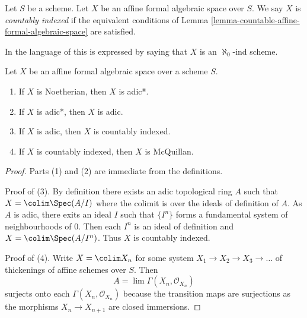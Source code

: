 \begin{definition}
\label{definition-countable}
Let $S$ be a scheme. Let $X$ be an affine formal algebraic space over $S$.
We say $X$ is {\it countably indexed} if the equivalent conditions of
Lemma \ref{lemma-countable-affine-formal-algebraic-space} are satisfied.
\end{definition}

\noindent
In the language of \cite{BVGD} this is expressed by saying that
$X$ is an $\aleph_0$-ind scheme.

\begin{lemma}
\label{lemma-implications-between-types}
Let $X$ be an affine formal algebraic space over a scheme $S$.
\begin{enumerate}
\item If $X$ is Noetherian, then $X$ is adic*.
\item If $X$ is adic*, then $X$ is adic.
\item If $X$ is adic, then $X$ is countably indexed.
\item If $X$ is countably indexed, then $X$ is McQuillan.
\end{enumerate}
\end{lemma}

\begin{proof}
Parts (1) and (2) are immediate from the definitions.

\medskip\noindent
Proof of (3). By definition there exists an adic topological ring $A$
such that $X = \colim \Spec(A/I)$ where the colimit is over the ideals
of definition of $A$. As $A$ is adic, there exits an ideal $I$
such that $\{I^n\}$ forms a fundamental system of neighbourhoods of $0$.
Then each $I^n$ is an ideal of definition and $X = \colim \Spec(A/I^n)$.
Thus $X$ is countably indexed.

\medskip\noindent
Proof of (4). Write $X = \colim X_n$
for some system $X_1 \to X_2 \to X_3 \to \ldots$ of thickenings of affine
schemes over $S$. Then
$$
A = \lim \Gamma(X_n, \mathcal{O}_{X_n})
$$
surjects onto each $\Gamma(X_n, \mathcal{O}_{X_n})$ because the transition
maps are surjections as the morphisms $X_n \to X_{n + 1}$ are closed
immersions.
\end{proof}

